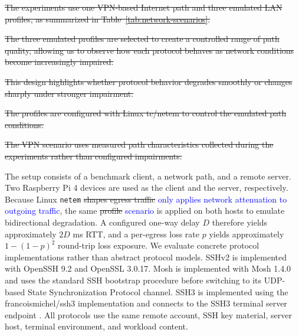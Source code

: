 \sout{The experiments use one VPN-based Internet path and three emulated LAN profiles, as summarized in Table~\ref{tab:network-scenarios}.}

\sout{The three emulated profiles are selected to create a controlled range of path quality, allowing us to observe how each protocol behaves as network conditions become increasingly impaired.}

\sout{This design highlights whether protocol behavior degrades smoothly or changes sharply under stronger impairment.}

\sout{The profiles are configured with Linux tc/netem to control the emulated path conditions.}

\sout{The VPN scenario uses measured path characteristics collected during the experiments rather than configured impairments.}




\begin{table}[t]
\centering
\caption{Network configuration parameters in the evaluated network environments}
\label{tab:network-scenarios}

\end{table}

The setup consists of a benchmark client, a network path, and a remote server. Two Raspberry Pi 4 devices are used as the client and the server, respectively. Because Linux \texttt{netem} \sout{shapes egress traffic} \textcolor{blue}{only applies network attenuation to outgoing traffic}, the same \sout{profile} \textcolor{blue}{scenario} is applied on both hosts to emulate bidirectional degradation. A configured one-way delay $D$ therefore yields approximately $2D$ ms RTT, and a per-egress loss rate $p$ yields approximately $1-(1-p)^2$ round-trip loss exposure. We evaluate concrete protocol implementations rather than abstract protocol models. SSHv2 is implemented with OpenSSH 9.2 and OpenSSL 3.0.17. Mosh is implemented with Mosh 1.4.0 and uses the standard SSH bootstrap procedure before switching to its UDP-based State Synchronization Protocol channel. SSH3 is implemented using the francoismichel/ssh3 implementation and connects to the SSH3 terminal server endpoint \cite{michel2023}. All protocols use the same remote account, SSH key material, server host, terminal environment, and workload content.

